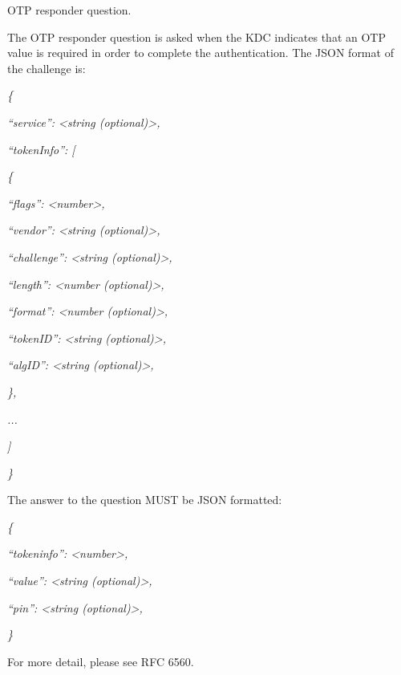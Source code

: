 \documentclass[letterpaper,10pt,english]{sphinxmanual}
\begin{document}
\begin{fulllineitems}
\label{appdev/refs/macros/KRB5_RESPONDER_QUESTION_OTP:KRB5_RESPONDER_QUESTION_OTP}
\end{fulllineitems}


OTP responder question.

The OTP responder question is asked when the KDC indicates that an OTP value is required in order to complete the authentication. The JSON format of the challenge is:

\emph{\{}

\emph{``service'': \textless{}string (optional)\textgreater{},}

\emph{``tokenInfo'': {[}}

\emph{\{}

\emph{``flags'': \textless{}number\textgreater{},}

\emph{``vendor'': \textless{}string (optional)\textgreater{},}

\emph{``challenge'': \textless{}string (optional)\textgreater{},}

\emph{``length'': \textless{}number (optional)\textgreater{},}

\emph{``format'': \textless{}number (optional)\textgreater{},}

\emph{``tokenID'': \textless{}string (optional)\textgreater{},}

\emph{``algID'': \textless{}string (optional)\textgreater{},}

\emph{\},}

\emph{...}

\emph{{]}}

\emph{\}}

The answer to the question MUST be JSON formatted:

\emph{\{}

\emph{``tokeninfo'': \textless{}number\textgreater{},}

\emph{``value'': \textless{}string (optional)\textgreater{},}

\emph{``pin'': \textless{}string (optional)\textgreater{},}

\emph{\}}

For more detail, please see RFC 6560.

\begin{tabulary}{\linewidth}{|L|L|}
\hline

 & 
\\
\hline\end{tabulary}
\end{document}
